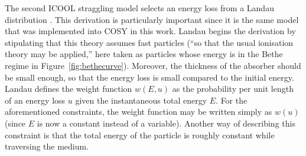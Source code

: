 \label{ssc:ICOOLStragglingLandau}
The second ICOOL straggling model selects an energy loss from a Landau distribution \cite{landau}. This derivation is particularly important since it is the same model that was implemented into COSY in this work. Landau begins the derivation by stipulating that this theory assumes fast particles (``so that the usual ionisation theory may be applied,'' here taken as particles whose energy is in the Bethe regime in Figure~\ref{fig:bethecurve}). Moreover, the thickness of the absorber should be small enough, so that the energy loss is small compared to the initial energy. Landau defines the weight function $w(E,u)$ as the probability per unit length of an energy loss $u$ given the instantaneous total energy $E$. For the aforementioned constraints, the weight function may be written simply as $w(u)$ (since $E$ is now a constant instead of a variable). Another way of describing this constraint is that the total energy of the particle is roughly constant while traversing the medium.

